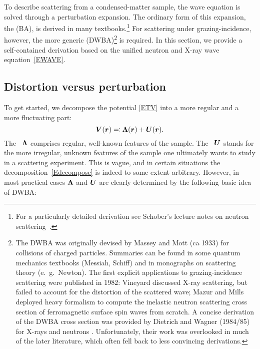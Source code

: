 To describe scattering from a condensed-matter sample,
%
%
%
the wave equation is solved through a perturbation expansion.
The ordinary form of this expansion, the  (BA),
%
%
is derived in many textbooks.\footnote
{For a particularly detailed derivation
see Schober's lecture notes on neutron scattering~\cite{Sch14}.}
For scattering under grazing-incidence,
%
however, the more generic
%
 (DWBA)\footnote
{The DWBA was originally devised by Massey and Mott (ca 1933)
for collisions of charged particles.
Summaries can be found in some quantum mechanics textbooks (Messiah, Schiff)
and in monographs on scattering theory (e.~g.\ Newton).
The first explicit applications to grazing-incidence scattering
were published in 1982:
Vineyard \cite{Vin82} discussed X-ray scattering,
but failed to account for the distortion of the scattered wave;
Mazur and Mills \cite{MaMi82} deployed heavy formalism
to compute the inelastic neutron scattering cross section
of ferromagnetic surface spin waves from scratch.
A concise derivation of the DWBA cross section
was provided by Dietrich and Wagner (1984/85)
for X-rays \cite{DiWa84} and neutrons \cite{DiWa85}.
Unfortunately, their work was overlooked in much of the later literature,
which often fell back to less convincing derivations.}
is required.
In this section, we provide a self-contained derivation
based on the unified neutron and X-ray wave equation~\cref{EWAVE}.

\subsection{Distortion versus perturbation}\label{Sdecompose}

To get started,
we decompose the potential \cref{ETV}
into a more regular and a more fluctuating part:
\begin{equation}\label{Edecompose}
  \bm{V}(\bm{r}) \eqqcolon \bm{\Lambda}(\bm{r}) + \bm{U}(\bm{r}).
\end{equation}
The ~$\bm{\Lambda}$
%
%
comprises regular, well-known features of the sample.
The ~$\bm{U}$
%
%
%
stands for the more irregular, unknown features of the sample
one ultimately wants to study in a scattering experiment.
This is vague,
and in certain situations the decomposition~\cref{Edecompose} is indeed
to some extent arbitrary.
However, in most practical cases $\bm{\Lambda}$ and $\bm{U}$ are clearly determined by
the following basic idea of DWBA:

